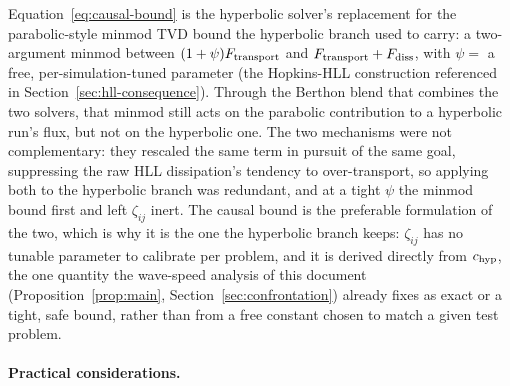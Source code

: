 Equation~\eqref{eq:causal-bound} is the hyperbolic solver's replacement
for the parabolic-style minmod TVD bound the hyperbolic branch used to
carry: a two-argument minmod between $(1+\psi)F_{\rm transport}$
and $F_{\rm transport}+F_{\rm diss}$, with
$\psi=$ a free,
per-simulation-tuned parameter (the Hopkins-HLL construction referenced in
Section~\ref{sec:hll-consequence}). Through the Berthon blend that
combines the two solvers, that minmod still acts on the parabolic
contribution to a hyperbolic run's flux, but not on the hyperbolic one.
The two mechanisms were not complementary: they rescaled the same term in
pursuit of the same goal, suppressing the raw HLL dissipation's tendency
to over-transport, so applying both to the hyperbolic branch was
redundant, and at a tight $\psi$ the minmod bound first and left
$\zeta_{ij}$ inert. The causal bound is the preferable formulation of the
two, which is why it is the one the hyperbolic branch keeps: $\zeta_{ij}$
has no tunable parameter to calibrate per problem, and it is derived
directly from $c_{\rm hyp}$, the one quantity the wave-speed analysis of this
document (Proposition~\ref{prop:main}, Section~\ref{sec:confrontation})
already fixes as exact or a tight, safe bound, rather than from a free
constant chosen to match a given test problem.

\paragraph{Practical considerations.}

